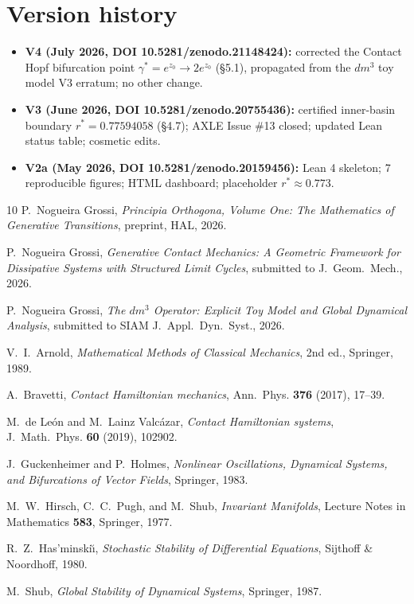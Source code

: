 \documentclass[11pt]{article}
\theoremstyle{boxed}
\begin{document}
\section*{Version history}

\begin{itemize}[leftmargin=2em]
  \item \textbf{V4 (July 2026, DOI 10.5281/zenodo.21148424):} corrected the Contact Hopf bifurcation point $\gamma^{*}=e^{z_0}\to2e^{z_0}$ (\S 5.1), propagated from the $dm^3$ toy model V3 erratum; no other change.
  \item \textbf{V3 (June 2026, DOI 10.5281/zenodo.20755436):} certified inner-basin boundary $r^{*} = 0.77594058$ (\S 4.7); AXLE Issue \#13 closed; updated Lean status table; cosmetic edits.
  \item \textbf{V2a (May 2026, DOI 10.5281/zenodo.20159456):} Lean 4 skeleton; 7 reproducible figures; HTML dashboard; placeholder $r^{*} \approx 0.773$.
\end{itemize}

\begin{thebibliography}{10}
P.~Nogueira Grossi, \emph{Principia Orthogona, Volume One: The Mathematics of
Generative Transitions}, preprint, HAL, 2026.

P.~Nogueira Grossi, \emph{Generative Contact Mechanics: A Geometric Framework for
Dissipative Systems with Structured Limit Cycles}, submitted to J.~Geom.~Mech., 2026.

P.~Nogueira Grossi, \emph{The $dm^3$ Operator: Explicit Toy Model and Global
Dynamical Analysis}, submitted to SIAM J.~Appl.~Dyn.~Syst., 2026.

V.~I.~Arnold, \emph{Mathematical Methods of Classical Mechanics}, 2nd ed.,
Springer, 1989.

A.~Bravetti, \emph{Contact Hamiltonian mechanics}, Ann.~Phys. \textbf{376} (2017),
17--39.

M.~de Le\'on and M.~Lainz Valc\'azar, \emph{Contact Hamiltonian systems},
J.~Math.~Phys. \textbf{60} (2019), 102902.

J.~Guckenheimer and P.~Holmes, \emph{Nonlinear Oscillations, Dynamical Systems,
and Bifurcations of Vector Fields}, Springer, 1983.

M.~W.~Hirsch, C.~C.~Pugh, and M.~Shub, \emph{Invariant Manifolds},
Lecture Notes in Mathematics \textbf{583}, Springer, 1977.

R.~Z.~Has\textquoteright minski\u{\i}, \emph{Stochastic Stability of Differential
Equations}, Sijthoff \& Noordhoff, 1980.

M.~Shub, \emph{Global Stability of Dynamical Systems}, Springer, 1987.
\end{thebibliography}
\end{document}

